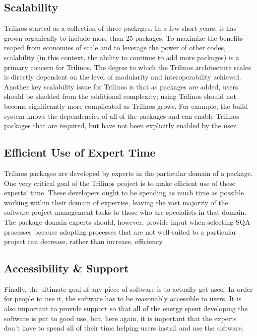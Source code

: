 \documentclass[12pt,relax]{article}
\begin{document}
\subsection{Scalability}
Trilinos started as a collection of three packages.  In a few short years, it
has grown organically to include more than 25 packages.  To maximize the
benefits reaped from economies of scale and to leverage the power of other
codes, scalability (in this context, the ability to continue to add more
packages) is a primary concern for Trilinos.  The degree to which the Trilinos
architecture scales is directly dependent on the level of modularity and
interoperability achieved.  Another key scalability issue for Trilinos is that
as packages are added, users should be shielded from the additional complexity;
using Trilinos should not become significantly more complicated as Trilinos
grows.  For example, the build system knows the dependencies of all of the 
packages and can enable Trilinos packages that are required, but have 
not been explicitly enabled by the user.

\subsection{Efficient Use of Expert Time}
Trilinos packages are developed by experts in the particular domain of a
package.  One very critical goal of the Trilinos project is to make efficient
use of these experts' time.  These developers ought to be spending as much 
time as possible working within their domain of expertise, leaving 
the vast majority of the software project 
management tasks to those who are specialists in that domain. 
The package domain experts should, however, provide input when selecting 
SQA processes because adopting processes that are not well-suited to a
particular project can decrease, rather than increase, efficiency.

\subsection{Accessibility \& Support}
Finally, the ultimate goal of any piece of software is to actually get used.  
In order for people to use it, the software has to be reasonably accessible to
users.  It is also important to provide support so that all of the energy spent
developing the software is put to good use, but, here again, it is important
that the experts don't have to spend all of their time helping users install
and use the software.
\end{document}
